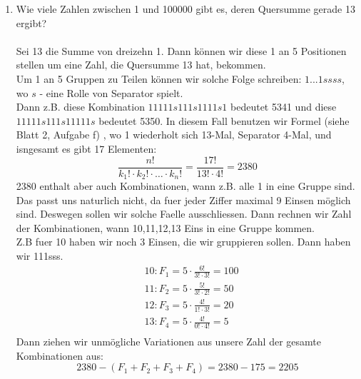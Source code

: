 \begin{enumerate}[label=(\alph*)]
        \item Wie viele Zahlen zwischen 1 und 100000 gibt es, deren Quersumme gerade 13 ergibt?\\\\
        Sei 13 die Summe von dreizehn 1. Dann k\"onnen wir diese 1 an 5 Positionen 
        stellen um eine Zahl, die Quersumme 13 hat, bekommen.\\
        Um 1 an 5 Gruppen zu Teilen k\"onnen wir solche Folge schreiben:
        $1...1 s s s s$, wo $s$ - eine Rolle von Separator spielt.\\ Dann z.B. diese
        Kombination $11111s111s1111s1$ bedeutet 5341 und diese $11111s111s11111s$
        bedeutet 5350. In diesem Fall benutzen wir Formel (siehe Blatt 2, Aufgabe f)
        , wo 1 wiederholt sich 13-Mal, Separator 4-Mal, und isngesamt es gibt 17 Elementen:
        \[\frac{n!}{k_1!\cdot k_2!\cdot\ldots\cdot k_n!} = \frac{17!}{13!\cdot4!} = 2380\]
        2380 enthalt aber auch Kombinationen, wann z.B. alle 1 in eine Gruppe sind. 
        Das passt uns naturlich nicht, da fuer jeder Ziffer maximal 9 Einsen m\"oglich sind.
        Deswegen sollen wir solche Faelle ausschliessen. Dann rechnen wir Zahl der 
        Kombinationen, wann 10,11,12,13 Eins in eine Gruppe kommen. \\
        Z.B fuer 10 haben wir noch 3 Einsen, die wir gruppieren sollen. Dann haben wir 111sss.
        \begin{align*}
        	&10: F_1 = 5 \cdot \frac{6!}{3!\cdot3!} = 100\\
        	&11: F_2 = 5 \cdot \frac{5!}{3!\cdot2!} = 50\\
        	&12: F_3 = 5 \cdot \frac{4!}{1!\cdot3!} = 20\\
        	&13: F_4 = 5 \cdot \frac{4!}{0!\cdot4!} = 5\\
        \end{align*}
        Dann ziehen wir unm\"ogliche Variationen aus unsere Zahl der gesamte Kombinationen aus:
        \[2380 - (F_1+F_2+F_3+F_4) = 2380 - 175 = 2205\]
    \end{enumerate}
